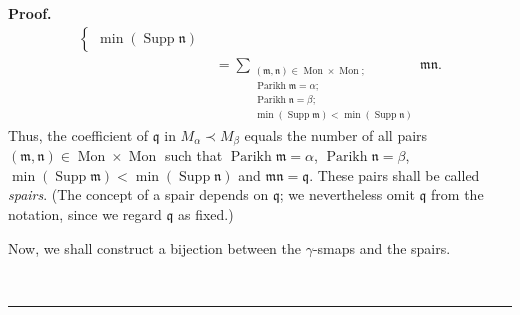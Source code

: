 \documentclass
[numbers=enddot,12pt,final,onecolumn,notitlepage,abstracton]{scrartcl}%
\theoremstyle{definition}
\newenvironment{proof}[1][Proof]{\noindent\textbf{#1.} }{\ \rule{0.5em}{0.5em}}
\newenvironment{verlong}{}{}
\let\sumnonlimits\sum
\renewcommand{\sum}{\sumnonlimits\limits}
\begin{document}
\begin{proof}
\begin{verlong}
\begin{align*}
\begin{cases}
\min\left(  \operatorname*{Supp}\mathfrak{n}\right)
\end{cases}
\\
&  =\sum_{\substack{\left(  \mathfrak{m},\mathfrak{n}\right)  \in
\operatorname*{Mon}\times\operatorname*{Mon};\\\operatorname*{Parikh}%
\mathfrak{m}=\alpha;\\\operatorname*{Parikh}\mathfrak{n}=\beta;\\\min\left(
\operatorname*{Supp}\mathfrak{m}\right)  <\min\left(  \operatorname*{Supp}%
\mathfrak{n}\right)  }}\mathfrak{mn}.
\end{align*}
Thus, the coefficient of $\mathfrak{q}$ in $M_{\alpha}\left.  \prec\right.
M_{\beta}$ equals the number of all pairs $\left(  \mathfrak{m},\mathfrak{n}%
\right)  \in\operatorname*{Mon}\times\operatorname*{Mon}$ such that
$\operatorname*{Parikh}\mathfrak{m}=\alpha$, $\operatorname*{Parikh}%
\mathfrak{n}=\beta$, $\min\left(  \operatorname*{Supp}\mathfrak{m}\right)
<\min\left(  \operatorname*{Supp}\mathfrak{n}\right)  $ and $\mathfrak{mn}%
=\mathfrak{q}$. These pairs shall be called \textit{spairs}. (The concept of a
spair depends on $\mathfrak{q}$; we nevertheless omit $\mathfrak{q}$ from the
notation, since we regard $\mathfrak{q}$ as fixed.)

Now, we shall construct a bijection between the $\gamma$-smaps and the spairs.


\end{verlong}
\end{proof}
\end{document}
